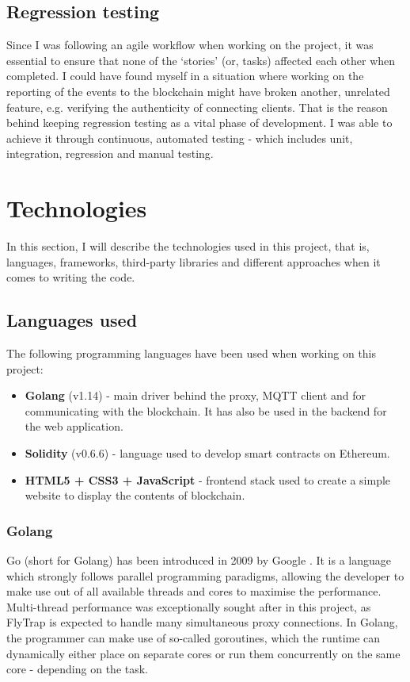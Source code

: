 \subsection{Regression testing}

Since I was following an agile workflow when working on the project, it was essential to ensure that none of the `stories' (or, tasks) affected each other when completed. I could have found myself in a situation where working on the reporting of the events to the blockchain might have broken another, unrelated feature, e.g. verifying the authenticity of connecting clients. That is the reason behind keeping regression testing as a vital phase of development. I was able to achieve it through continuous, automated testing - which includes unit, integration, regression and manual testing.

\section{Technologies}

In this section, I will describe the technologies used in this project, that is, languages, frameworks, third-party libraries and different approaches when it comes to writing the code.

\subsection{Languages used}

The following programming languages have been used when working on this project:
\begin{itemize}
 \item \textbf{Golang} (v1.14) - main driver behind the proxy, MQTT client and for communicating with the blockchain. It has also be used in the backend for the web application.
 \item \textbf{Solidity} (v0.6.6) - language used to develop smart contracts on Ethereum.
 \item \textbf{HTML5 + CSS3 + JavaScript} - frontend stack used to create a simple website to display the contents of blockchain.
\end{itemize}

\subsubsection{Golang}
Go (short for Golang) has been introduced in 2009 by Google \cite{team2009go}. It is a language which strongly follows parallel programming paradigms, allowing the developer to make use out of all available threads and cores to maximise the performance. Multi-thread performance was exceptionally sought after in this project, as FlyTrap is expected to handle many simultaneous proxy connections. In Golang, the programmer can make use of so-called goroutines, which the runtime can dynamically either place on separate cores or run them concurrently on the same core - depending on the task.

